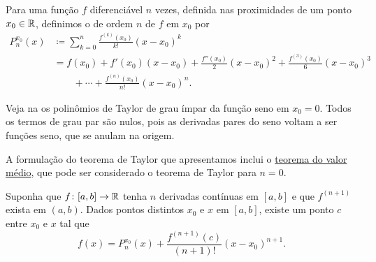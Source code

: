 \begin{defn}
Para uma função $f$ diferenciável $n$ vezes, definida nas proximidades de um ponto $x_0 \in {\mathbb{R}}$, definimos o \emph{}%
 de ordem $n$ de $f$ em $x_0$ por
\begin{equation*}
\begin{split}
P_n^{x_0}(x)
& \coloneqq
\sum_{k=0}^n
\frac{f^{(k)}(x_0)}{k!}{(x-x_0)}^k
\\
& =
f(x_0)
+ f'(x_0)(x-x_0)
+ \frac{f''(x_0)}{2}{(x-x_0)}^2
+ \frac{f^{(3)}(x_0)}{6}{(x-x_0)}^3
\\
& \qquad
+ \cdots
+ \frac{f^{(n)}(x_0)}{n!}{(x-x_0)}^n .
\end{split}
\end{equation*}
\end{defn}

Veja na  os polinômios de Taylor de grau ímpar da função seno em $x_0=0$.
Todos os termos de grau par são nulos, pois as derivadas pares do seno voltam a ser funções seno, que se anulam na origem.
\begin{myfigureht}
\caption{Os polinômios de Taylor de grau ímpar da função seno.\label{fig:taylorsin}}
\end{myfigureht}

A formulação do teorema de Taylor que apresentamos inclui o \hyperref[thm:mvt]{teorema do valor médio}, que pode ser considerado o teorema de Taylor para $n=0$.

\begin{thm}[Taylor] \label{thm:taylor}
Suponha que $f \colon [a,b] \to {\mathbb{R}}$ tenha $n$ derivadas contínuas em $[a,b]$ e que $f^{(n+1)}$ exista em $(a,b)$. Dados pontos distintos $x_0$ e $x$ em $[a,b]$, existe um ponto $c$ entre $x_0$ e $x$ tal que
\begin{equation*}
f(x)=P_{n}^{x_0}(x)+\frac{f^{(n+1)}(c)}{(n+1)!}{(x-x_0)}^{n+1} .
\end{equation*}
\end{thm}

